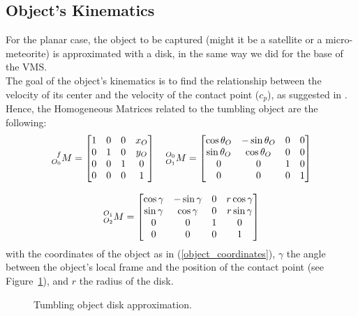 \documentclass[a4paper,12pt,oneside]{report}
\begin{document}
\subsection{Object's Kinematics}
For the planar case, the object to be captured (might it be a satellite or a micro-meteorite) is approximated with a  disk, in the same way we did for the base of the VMS.\\
The goal of the object's kinematics is to find the relationship between the velocity of its center and the velocity of the contact point ($c_p$), as suggested in \cite{twelve}.\\
Hence, the Homogeneous Matrices related to the tumbling object are the following:
\begin{equation}
  \begin{array}{c}
    \prescript{f}{O_0}{M}=\begin{bmatrix}
      1&0&0&x_O\\
    0&1&0&y_O\\
    0&0&1&0\\
    0&0&0&1
    \end{bmatrix}\quad
    \prescript{O_0}{O_1}{M}=\begin{bmatrix}
      \cos{\theta_O}&-\sin{\theta_O}&0&0\\
      \sin{\theta_O}&\cos{\theta_O}&0&0\\
      0&0&1&0\\
      0&0&0&1
    \end{bmatrix}\\
    \\
    \prescript{O_1}{O_2}{M}=\begin{bmatrix}
      \cos{\gamma}&-\sin{\gamma}&0&r \cos{\gamma}\\
      \sin{\gamma}&\cos{\gamma}&0&r \sin{\gamma}\\
      0&0&1&0\\
      0&0&0&1
    \end{bmatrix}
  \end{array}
\end{equation}
with the coordinates of the object as in (\ref{object_coordinates}), $\gamma$ the angle between the object's local frame and the position of the contact point (see Figure~\ref{contact_point}), and $r$ the radius of the disk.\\
\begin{figure}[h]
  \centering
  
  \caption{Tumbling object disk approximation.}
  \label{contact_point}
\end{figure}
\end{document}
